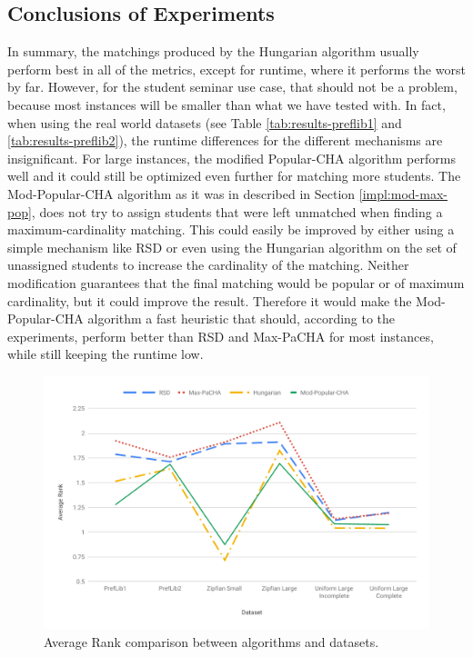 \subsection{Conclusions of Experiments}
In summary, the matchings produced by the Hungarian algorithm usually perform best in all of the metrics, except for runtime, where it performs the worst by far. However, for the student seminar use case, that should not be a problem, because most instances will be smaller than what we have tested with. In fact, when using the real world datasets (see Table \ref{tab:results-preflib1} and \ref{tab:results-preflib2}), the runtime differences for the different mechanisms are insignificant. For large instances, the modified Popular-CHA algorithm performs well and it could still be optimized even further for matching more students. The Mod-Popular-CHA algorithm as it was in described in Section \ref{impl:mod-max-pop}, does not try to assign students that were left unmatched when finding a maximum-cardinality matching. This could easily be improved by either using a simple mechanism like RSD or even using the Hungarian algorithm on the set of unassigned students to increase the cardinality of the matching. Neither modification guarantees that the final matching would be popular or of maximum cardinality, but it could improve the result. Therefore it would make the Mod-Popular-CHA algorithm a fast heuristic that should, according to the experiments, perform better than RSD and Max-PaCHA for most instances, while still keeping the runtime low.

\begin{figure}[h!]
  \centering
    \includegraphics[width=0.99\linewidth]{assets/plots/average_ranks_all.pdf}
    \caption{Average Rank comparison between algorithms and datasets.}
    \label{fig:average_ranks}
\end{figure}

